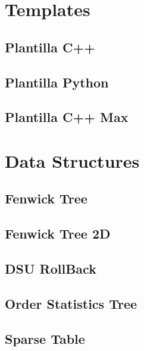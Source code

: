 \section{Templates}
\subsection{Plantilla C++}
\raggedbottom
\hrulefill
\subsection{Plantilla Python}
\raggedbottom
\hrulefill
\subsection{Plantilla C++ Max}
\raggedbottom
\hrulefill
\newpage

\section{Data Structures}
\subsection{Fenwick Tree}
\raggedbottom
\hrulefill
\subsection{Fenwick Tree 2D}
\raggedbottom
\hrulefill
\subsection{DSU RollBack}
\raggedbottom
\hrulefill
\subsection{Order Statistics Tree}
\raggedbottom
\hrulefill
\subsection{Sparse Table}
\raggedbottom
\hrulefill
